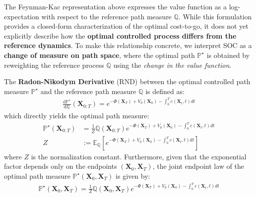 \documentclass{article}
\begin{document}
The Feynman-Kac representation above expresses the value function as a log-expectation with respect to the reference path measure $\mathbb{Q}$. While this formulation provides a closed-form characterization of the optimal cost-to-go, it does not yet explicitly describe how the \textbf{optimal controlled process differs from the reference dynamics}. To make this relationship concrete, we interpret SOC as a \textbf{change of measure on path space}, where the optimal path $\mathbb{P}^\star$ is obtained by reweighting the reference process $\mathbb{Q}$ using the \textit{change in the value function}. 

\begin{proposition}\label{prop:soc-optimal-measure}
    The \textbf{Radon-Nikodym Derivative} (RND) between the optimal controlled path measure $\mathbb{P}^\star$ and the reference path measure $\mathbb{Q}$ is defined as:
    \begin{align}
        \frac{\mathrm{d}\mathbb{P}^\star}{\mathrm{d}\mathbb{Q}}(\boldsymbol{X}_{0:T})=e^{-\Phi(\boldsymbol{X}_T)+V_0(\boldsymbol{X}_0)-\int_0^Tc(\boldsymbol{X}_t,t)dt}\tag{Optimal Path RND}\label{eq:optimal-path-rnd}
    \end{align}
    which directly yields the optimal path measure:
    \begin{align}
        \mathbb{P}^\star(\boldsymbol{X}_{0:T})&=\frac{1}{Z}\mathbb{Q}(\boldsymbol{X}_{0:T})e^{-\Phi(\boldsymbol{X}_T)+V_0(\boldsymbol{X}_0)-\int_0^Tc(\boldsymbol{X}_t,t)dt}\tag{Optimal Path Measure}\label{eq:soc-optimal-path-measure}\\
        Z&:= \mathbb{E}_{\mathbb{Q}}\left[e^{-\Phi(\boldsymbol{X}_T)+V_0(\boldsymbol{X}_0)-\int_0^Tc(\boldsymbol{X}_t,t)dt}\right]\tag{Normalization Constant}\label{eq:soc-normalization}
    \end{align}
    where $Z$ is the normalization constant. Furthermore, given that the exponential factor depends only on the endpoints $(\boldsymbol{X}_0, \boldsymbol{X}_T)$, the joint endpoint law of the optimal path measure $\mathbb{P}^\star(\boldsymbol{X}_0, \boldsymbol{X}_T)$ is given by:
    \begin{align}
        \mathbb{P}^\star(\boldsymbol{X}_0, \boldsymbol{X}_T)=\frac{1}{Z}\mathbb{Q}(\boldsymbol{X}_0, \boldsymbol{X}_T)e^{-\Phi(\boldsymbol{X}_T)+V_0(\boldsymbol{X}_0)-\int_0^Tc(\boldsymbol{X}_t,t)dt}\label{eq:soc-optimal-joint-dist}
    \end{align}
\end{proposition}
\end{document}
